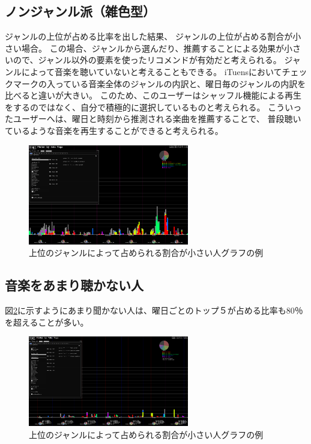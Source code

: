 \documentclass[11pt, twocolumn]{jsarticle}
\begin{document}
\subsection{ノンジャンル派（雑色型）}
ジャンルの上位が占める比率を出した結果、
ジャンルの上位が占める割合が小さい場合。
この場合、ジャンルから選んだり、推薦することによる効果が小さいので、ジャンル以外の要素を使ったリコメンドが有効だと考えられる。
ジャンルによって音楽を聴いていないと考えることもできる。
iTuensにおいてチェックマークの入っている音楽全体のジャンルの内訳と、曜日毎のジャンルの内訳を比べると違いが大きい。
このため、このユーザーはシャッフル機能による再生をするのではなく、自分で積極的に選択しているものと考えられる。
こういったユーザーへは、曜日と時刻から推測される楽曲を推薦することで、
普段聴いているような音楽を再生することができると考えられる。

\begin{figure}[h]
\begin{center}
\includegraphics[width=7cm]{topFive_light.png}
\caption{上位のジャンルによって占められる割合が小さい人グラフの例}
\label{topFive_heavy}
\end{center}
\end{figure}

\subsection{音楽をあまり聴かない人}
図\ref{lightListner}に示すようにあまり聞かない人は、曜日ごとのトップ５が占める比率も80％を超えることが多い。

\begin{figure}[h]
\begin{center}
\includegraphics[width=7cm]{takino.png}
\caption{上位のジャンルによって占められる割合が小さい人グラフの例}
\label{lightListner}
\end{center}
\end{figure}
\end{document}
